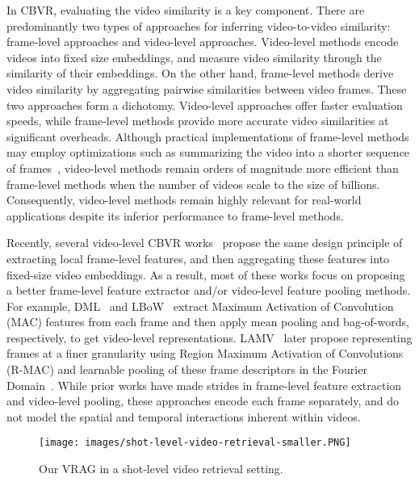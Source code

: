\documentclass[letterpaper]{article} \usepackage{aaai22}  \usepackage{times}  \usepackage{helvet}  \usepackage{courier}  \usepackage[hyphens]{url}  \usepackage{graphicx} \urlstyle{rm} \usepackage{amsmath}
\begin{document}
In CBVR, evaluating the video similarity is a key component. There are predominantly two types of approaches for inferring video-to-video similarity: frame-level approaches and video-level approaches. Video-level methods encode videos into fixed size embeddings, and measure video similarity through the similarity of their embeddings. On the other hand, frame-level methods derive video similarity by aggregating pairwise similarities between video frames. These two approaches form a dichotomy. Video-level approaches offer faster evaluation speeds, while frame-level methods provide more accurate video similarities at significant overheads. Although practical implementations of frame-level methods may employ optimizations such as summarizing the video into a shorter sequence of frames~\cite{vid-summary:1708-09545, vid-summary:1812-01969, vid-summary:zhou2018deep}, video-level methods remain orders of magnitude more efficient than frame-level methods when the number of videos scale to the size of billions. Consequently, video-level methods remain highly relevant for real-world applications despite its inferior performance to frame-level methods.

Recently, several video-level CBVR works~\cite{lbow, Baraldi2018LAMVLT, kordopatis2017dml, baseline:tmk} propose the same design principle of extracting local frame-level features, and then aggregating these features into fixed-size video embeddings. As a result, most of these works focus on proposing a better frame-level feature extractor and/or video-level feature pooling methods. For example, DML~\cite{kordopatis2017dml} and LBoW~\cite{lbow} extract Maximum Activation of Convolution (MAC) features from each frame and then apply mean pooling and bag-of-words, respectively, to get video-level representations. LAMV~\cite{Baraldi2018LAMVLT} later propose representing frames at a finer granularity using Region Maximum Activation of Convolutions (R-MAC) and learnable pooling of these frame descriptors in the Fourier Domain~\cite{baseline:tmk}. While prior works have made strides in frame-level feature extraction and video-level pooling, these approaches encode each frame separately, and do not model the spatial and temporal interactions inherent within videos. 

\begin{figure}[t]
    \centering
    \texttt{[image: images/shot-level-video-retrieval-smaller.PNG]}
    \caption{Our VRAG in a shot-level video retrieval setting.} \vspace{-3mm}
    \label{fig:shot-retrieval-diagram}
\end{figure}
\end{document}
